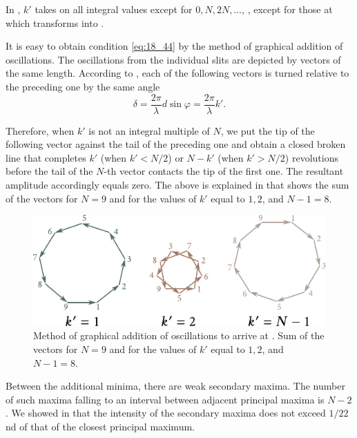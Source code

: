 \noindent
In , $k'$ takes on all integral values except for $0, N, 2N, \ldots$, \ie, except for those at which  transforms into
.

It is easy to obtain condition \eqref{eq:18_44} by the method of graphical addition of oscillations.
The oscillations from the individual slits are depicted by vectors of the same length.
According to , each of the following vectors is turned relative to the preceding one by the same angle
\begin{equation*}
	\delta = \frac{2\pi}{\lambda} d\sin\varphi = \frac{2\pi}{\lambda} k'.
\end{equation*}

\noindent
Therefore, when $k'$ is not an integral multiple of $N$, we put the tip of the following vector against the tail of the preceding one and obtain a closed broken line that completes $k'$ (when $k'<N/2$) or $N-k'$ (when $k'>N/2$) revolutions before the tail of the $N$-th vector contacts the tip of the first one.
The resultant amplitude accordingly equals zero. The above is explained in  that shows the sum of the vectors for $N=9$ and for the values of $k'$ equal to $1, 2$, and $N-1=8$.

\begin{figure}[!htb]
	\begin{center}
		\includegraphics[scale=0.95]{figures/ch_18/fig_18_33.pdf}
        \caption[]{Method of graphical addition of oscillations to arrive at . Sum of the vectors for $N = 9$ and for the values of $k'$ equal to $1, 2$, and $N-1= 8$.}
		\label{fig:18_33}
	\end{center}
	\vspace{-0.7cm}
\end{figure}

Between the additional minima, there are weak secondary maxima.
The number of such maxima falling to an interval between adjacent principal maxima is $N-2$.
We showed in  that the intensity of the secondary maxima does not exceed $1/22$nd of that of the closest principal maximum.


